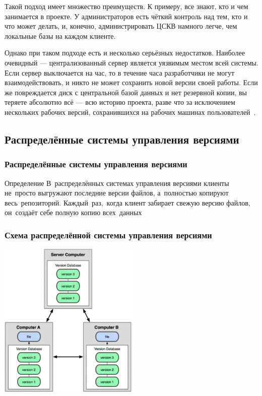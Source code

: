\documentclass{../industrial-development}
\begin{document}
\lecturenotes

Такой подход имеет множество преимуществ. К примеру, все знают, кто и чем занимается в проекте. У администраторов есть чёткий контроль над тем, кто и что может делать, и, конечно, администрировать ЦСКВ намного легче, чем локальные базы на каждом клиенте.

Однако при таком подходе есть и несколько серьёзных недостатков. Наиболее очевидный — централизованный сервер является уязвимым местом всей системы. Если сервер выключается на час, то в течение часа разработчики не могут взаимодействовать, и никто не может сохранить новой версии своей работы. Если же повреждается диск с центральной базой данных и нет резервной копии, вы теряете абсолютно всё — всю историю проекта, разве что за исключением нескольких рабочих версий, сохранившихся на рабочих машинах пользователей~\cite[с.~6--7]{ProGit}.

\subsection{Распределённые системы управления версиями}

\begin{frame} \frametitle{Распределённые системы управления версиями}
  \begin{block}{Определение}
    В~\alert{распределённых системах управления версиями} клиенты не~просто выгружают последние версии файлов, а~полностью копируют весь~репозиторий. Каждый~раз,~когда клиент забирает свежую версию файлов, он~создаёт себе полную копию всех~данных
  \end{block}
 
\end{frame}

\begin{frame} \frametitle{Схема распределённой системы управления версиями}
  \centerline{\includegraphics[width=0.5\textwidth]{distributedVCS.pdf}}
\end{frame}
\end{document}
